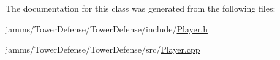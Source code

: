 The documentation for this class was generated from the following files\+:\begin{DoxyCompactItemize}
\item 
jamms/\+Tower\+Defense/\+Tower\+Defense/include/\hyperlink{_player_8h}{Player.\+h}\item 
jamms/\+Tower\+Defense/\+Tower\+Defense/src/\hyperlink{_player_8cpp}{Player.\+cpp}\end{DoxyCompactItemize}
